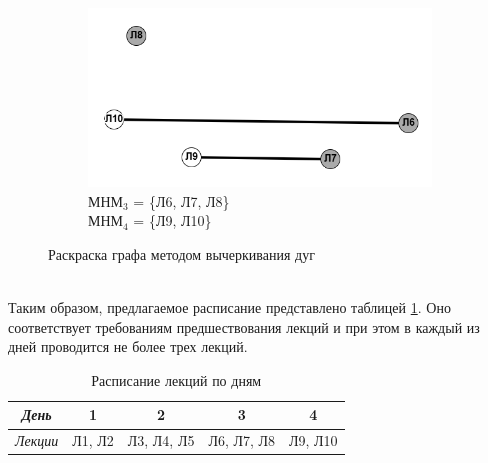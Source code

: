 \documentclass{article}
\begin{document}
\begin{enumerate}
\begin{figure}[ht]
\begin{subfigure}[b]{0.3\textwidth}
         \includegraphics[width=\textwidth]{attachments/15/15_3.png}
         \caption*{\footnotesize{$\text{МНМ}_3$ = \{Л6, Л7, Л8\}\\$\text{МНМ}_4$ = \{Л9, Л10\}}}
         \label{fig:15_3}
     \end{subfigure}
    \caption{Раскраска графа методом вычеркивания дуг}
    \label{fig:15_colours}
\end{figure}
\\
Таким образом, предлагаемое расписание представлено таблицей \ref{tab:15_timetable}. Оно соответствует требованиям предшествования лекций и при этом в каждый из дней проводится не более трех лекций. 
\begin{table}[ht]
    \centering
    \begin{tabular}{|c|c|c|c|c|}
    \hline
        \textit{День} & 1 & 2 & 3 & 4 \\ \hline
        \textit{Лекции} & Л1, Л2 & Л3, Л4, Л5 & Л6, Л7, Л8 & Л9, Л10 \\ \hline
    \end{tabular}
    \caption{Расписание лекций по дням}
    \label{tab:15_timetable}
\end{table}
\end{enumerate}
\end{document}
